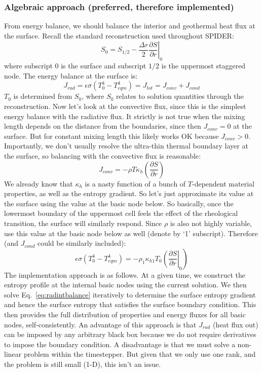 \subsubsection{Algebraic approach (preferred, therefore implemented)}
From energy balance, we should balance the interior and geothermal heat flux at the surface.  Recall the standard reconstruction used throughout SPIDER:
\begin{equation}
S_0 = S_{1/2} - \frac{\Delta r}{2} \left.\frac{\partial S}{\partial r}\right|_0
\end{equation}
where subscript 0 is the surface and subscript $1/2$ is the uppermost staggered node.  The energy balance at the surface is:
\begin{equation}
J_{rad} = \epsilon \sigma (T_0^4 - T_{eqm}^4) = J_{tot} = J_{conv} + J_{cond}
\end{equation}
$T_0$ is determined from $S_0$, where $S_0$ relates to solution quantities through the reconstruction.  Now let's look at the convective flux, since this is the simplest energy balance with the radiative flux.  It strictly is not true when the mixing length depends on the distance from the boundaries, since then $J_{conv}=0$ at the surface.  But for constant mixing length this likely works OK because $J_{conv} > 0$.  Importantly, we don't usually resolve the ultra-thin thermal boundary layer at the surface, so balancing with the convective flux is reasonable:
\begin{equation}
J_{conv} = -\rho T \kappa_h \left( \frac{\partial S}{\partial r} \right)
\end{equation}
We already know that $\kappa_h$ is a nasty function of a bunch of $T$-dependent material properties, as well as the entropy gradient.  So let's just approximate its value at the surface using the value at the basic node below.  So basically, once the lowermost boundary of the uppermost cell feels the effect of the rheological transition, the surface will similarly respond.  Since $\rho$ is also not highly variable, use this value at the basic node below as well (denote by `1' subscript).  Therefore (and $J_{cond}$ could be similarly included):
\begin{equation}
\epsilon \sigma (T_0^4 - T_{eqm}^4) = -\rho_1 \kappa_{h1} T_0 \left. \left( \frac{\partial S}{\partial r} \right|_0 \right)
\label{eq:radintbalance}
\end{equation}
The implementation approach is as follows.  At a given time, we construct the entropy profile at the internal basic nodes using the current solution.  We then solve Eq.~\ref{eq:radintbalance} iteratively to determine the surface entropy gradient and hence the surface entropy that satisfies the surface boundary condition.  This then provides the full distribution of properties and energy fluxes for all basic nodes, self-consistently.  An advantage of this approach is that $J_{rad}$ (heat flux out) can be imposed by any arbitrary black box because we do not require derivatives to impose the boundary condition.  A disadvantage is that we must solve a non-linear problem within the timestepper.  But given that we only use one rank, and the problem is still small (1-D), this isn't an issue.
